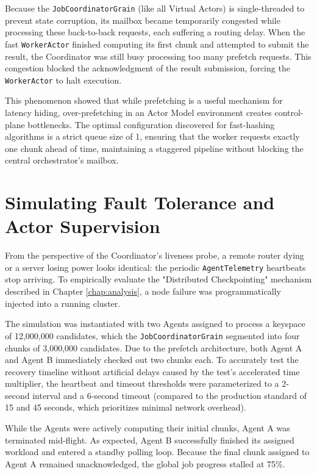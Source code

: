 Because the \verb|JobCoordinatorGrain| (like all Virtual Actors) is single-threaded to prevent state corruption, its mailbox became temporarily congested while processing these back-to-back requests, each suffering a routing delay. When the fast \verb|WorkerActor| finished computing its first chunk and attempted to submit the result, the Coordinator was still busy processing too many prefetch requests. This congestion blocked the acknowledgment of the result submission, forcing the \verb|WorkerActor| to halt execution.

This phenomenon showed that while prefetching is a useful mechanism for latency hiding, over-prefetching in an Actor Model environment creates control-plane bottlenecks. The optimal configuration discovered for fast-hashing algorithms is a strict queue size of 1, ensuring that the worker requests exactly one chunk ahead of time, maintaining a staggered pipeline without blocking the central orchestrator's mailbox.

\section{Simulating Fault Tolerance and Actor Supervision}
From the perspective of the Coordinator's liveness probe, a remote router dying or a server losing power looks identical: the periodic \verb|AgentTelemetry| heartbeats stop arriving. To empirically evaluate the "Distributed Checkpointing" mechanism described in Chapter \ref{chap:analysis}, a node failure was programmatically injected into a running cluster.

The simulation was instantiated with two Agents assigned to process a keyspace of 12,000,000 candidates, which the \verb|JobCoordinatorGrain| segmented into four chunks of 3,000,000 candidates. Due to the prefetch architecture, both Agent A and Agent B immediately checked out two chunks each. To accurately test the recovery timeline without artificial delays caused by the test's accelerated time multiplier, the heartbeat and timeout thresholds were parameterized to a 2-second interval and a 6-second timeout (compared to the production standard of 15 and 45 seconds, which prioritizes minimal network overhead).

While the Agents were actively computing their initial chunks, Agent A was terminated mid-flight. As expected, Agent B successfully finished its assigned workload and entered a standby polling loop. Because the final chunk assigned to Agent A remained unacknowledged, the global job progress stalled at 75\%.

